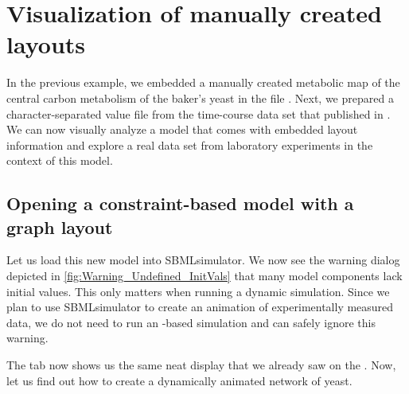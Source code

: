 
\chapter{Visualization of manually created layouts}
\label{chap:VisLayout}

In the previous example, we embedded a manually created metabolic map of the central carbon metabolism of the baker's yeast in the \SBML file \iMM \citep{Mo2009}.
Next, we prepared a character-separated value file from the time-course data set that \citeauthor{Bergdahl2012} published in \citeyear{Bergdahl2012}.
We can now visually analyze a model that comes with embedded layout information and explore a real data set from laboratory experiments in the context of this model.

\section{Opening a constraint-based model with a graph layout}

Let us load this new model into SBMLsimulator.
We now see the warning dialog depicted in \cref{fig:Warning_Undefined_InitVals} that many model components lack initial values.
This only matters when running a dynamic simulation.
Since we plan to use SBMLsimulator to create an animation of experimentally measured data, we do not need to run an \ODE-based simulation and can safely ignore this warning.
\begin{SCfigure}
  \caption[Warning when loading a model with undefined initial values]{Warning when loading a model with undefined initial values.
  Constraint-based models, such as \iMM, can be simulated in a flux-balance framework that does not require initial amounts to be known for reactive species.
  This warning indicates that the model cannot directly be simulated in an \ODE framework.
  SBMLsimulator automatically assigns the value 1 where missing.
  It is also possible to estimate missing values using \EvA.}
  \label{fig:Warning_Undefined_InitVals}
\end{SCfigure}

The  tab now shows us the same neat display that we already saw on the \BiGG \citep{King2015b, Norsigian2019}.
Now, let us find out how to create a dynamically animated network of yeast.

